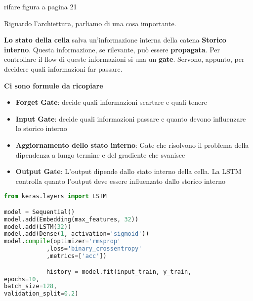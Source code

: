 rifare figura a pagina 21

Riguardo l'archiettura, parliamo di una cosa importante.

\textbf{Lo stato della cella} salva un'informazione interna della catena \textbf{Storico interno}. Questa informazione,
se rilevante, può essere \textbf{propagata}. Per controllare il flow di queste informazioni si una un \textbf{gate}. Servono, appunto, 
per decidere quali informazioni far passare.


\textbf{Ci sono formule da ricopiare}
\begin{itemize}
    \item \textbf{Forget Gate}: decide quali informazioni scartare e quali tenere
    \item \textbf{Input Gate}: decide quali informazioni passare e quanto devono influenzare lo storico interno
    \item \textbf{Aggiornamento dello stato interno}: Gate che risolvono il problema della dipendenza a lungo termine e del gradiente che svanisce
    \item \textbf{Output Gate}: L'output dipende dallo stato interno della cella. La LSTM controlla quanto l'output deve essere influenzato dallo storico interno
\end{itemize}

\begin{lstlisting}[language=python]
from keras.layers import LSTM

model = Sequential()
model.add(Embedding(max_features, 32))
model.add(LSTM(32))
model.add(Dense(1, activation='sigmoid'))
model.compile(optimizer='rmsprop'
            ,loss='binary_crossentropy'
            ,metrics=['acc'])

            history = model.fit(input_train, y_train,
epochs=10,
batch_size=128,
validation_split=0.2)
\end{lstlisting}

\newpage